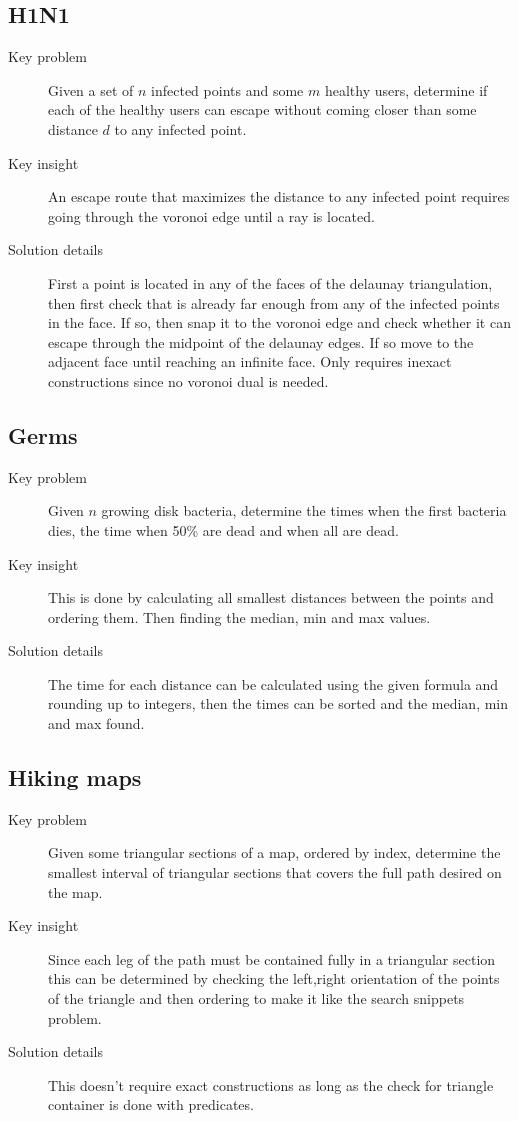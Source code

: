 \documentclass[11pt]{book}
\begin{document}
\subsection{H1N1}

\begin{description}
	\item[Key problem] Given a set of $n$ infected points and some $m$ healthy users, determine if each of the healthy users can escape without coming closer than some distance $d$ to any infected point.
	\item[Key insight] An escape route that maximizes the distance to any infected point requires going through the voronoi edge until a ray is located.
	\item[Solution details] First a point is located in any of the faces of the delaunay triangulation, then first check that is already far enough from any of the infected points in the face. If so, then snap it to the voronoi edge and check whether it can escape through the midpoint of the delaunay edges. If so move to the adjacent face until reaching an infinite face. Only requires inexact constructions since no voronoi dual is needed.
\end{description}

\subsection{Germs}

\begin{description}
	\item[Key problem] Given $n$ growing disk bacteria, determine the times when the first bacteria dies, the time when 50\% are dead and when all are dead.
	\item[Key insight] This is done by calculating all smallest distances between the points and ordering them. Then finding the median, min and max values.
	\item[Solution details] The time for each distance can be calculated using the given formula and rounding up to integers, then the times can be sorted and the median, min and max found.
\end{description}

\subsection{Hiking maps}

\begin{description}
	\item[Key problem] Given some triangular sections of a map, ordered by index, determine the smallest interval of triangular sections that covers the full path desired on the map.
	\item[Key insight] Since each leg of the path must be contained fully in a triangular section this can be determined by checking the left,right orientation of the points of the triangle and then ordering to make it like the search snippets problem.
	\item[Solution details] This doesn't require exact constructions as long as the check for triangle container is done with predicates.
\end{description}
\end{document}
